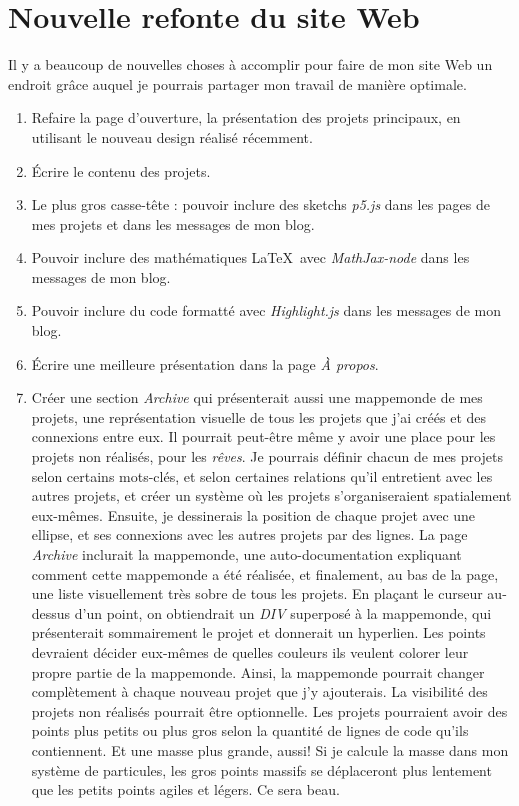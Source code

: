 
\newpage
\section{Nouvelle refonte du site Web}

Il y a beaucoup de nouvelles choses à accomplir pour faire de mon site Web un endroit grâce auquel je pourrais partager mon travail de manière optimale.

\begin{enumerate}  
\item Refaire la page d'ouverture, la présentation des projets principaux, en utilisant le nouveau design réalisé récemment.
\item Écrire le contenu des projets.
\item Le plus gros casse-tête : pouvoir inclure des sketchs \textit{p5.js} dans les pages de mes projets et dans les messages de mon blog.
\item Pouvoir inclure des mathématiques \LaTeX\ avec \textit{MathJax-node} dans les messages de mon blog.
\item Pouvoir inclure du code formatté avec \textit{Highlight.js} dans les messages de mon blog.
\item Écrire une meilleure présentation dans la page \textit{À propos}.
\item Créer une section \textit{Archive} qui présenterait aussi une mappemonde de mes projets, une représentation visuelle de tous les projets que j'ai créés et des connexions entre eux. Il pourrait peut-être même y avoir une place pour les projets non réalisés, pour les \textit{rêves}. Je pourrais définir chacun de mes projets selon certains mots-clés, et selon certaines relations qu'il entretient avec les autres projets, et créer un système où les projets s'organiseraient spatialement eux-mêmes. Ensuite, je dessinerais la position de chaque projet avec une ellipse, et ses connexions avec les autres projets par des lignes. La page \textit{Archive} inclurait la mappemonde, une auto-documentation expliquant comment cette mappemonde a été réalisée, et finalement, au bas de la page, une liste visuellement très sobre de tous les projets. En plaçant le curseur au-dessus d'un point, on obtiendrait un \textit{DIV} superposé à la mappemonde, qui présenterait sommairement le projet et donnerait un hyperlien. Les points devraient décider eux-mêmes de quelles couleurs ils veulent colorer leur propre partie de la mappemonde. Ainsi, la mappemonde pourrait changer complètement à chaque nouveau projet que j'y ajouterais. La visibilité des projets non réalisés pourrait être optionnelle. Les projets pourraient avoir des points plus petits ou plus gros selon la quantité de lignes de code qu'ils contiennent. Et une masse plus grande, aussi! Si je calcule la masse dans mon système de particules, les gros points massifs se déplaceront plus lentement que les petits points agiles et légers. Ce sera beau.
\end{enumerate}

